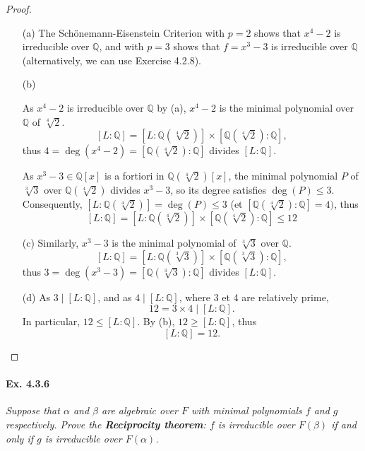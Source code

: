 \documentclass[11pt,a4paper]{article}
\newcommand{\Q}{\mathbb{Q}}
\begin{document}
\begin{proof}
\begin{enumerate}
\item[(a)]
The Sch\"onemann-Eisenstein Criterion with $p=2$ shows that $x^4-2$ is irreducible over $\Q$, and with $p=3$ shows that $f = x^3-3$ is irreducible over $\Q$ (alternatively, we can use Exercise 4.2.8).

\item[(b)]

As $x^4-2$ is irreducible over $\Q$ by (a), $x^4 - 2$ is the minimal polynomial over $\Q$ of $\sqrt[4]{2}$.
$$ [L : \Q] = [L : \Q(\sqrt[4]{2})] \times [\Q(\sqrt[4]{2}):\Q], $$ 
thus $4 = \deg(x^4-2) =  [\Q(\sqrt[4]{2}):\Q]$ divides $ [L : \Q] $.

As $x^3 - 3 \in \mathbb{Q}[x]$ is a fortiori in $\mathbb{Q}(\sqrt[4]{2})[x]$, the minimal polynomial $P$ of $\sqrt[3]{3}$ over $\Q(\sqrt[4]{2})$ divides $x^3-3$, so its degree satisfies $\deg(P) \leq 3$. Consequently, $[L : \Q(\sqrt[4]{2})] = \deg(P) \leq 3$ (et $[\Q(\sqrt[4]{2}):\Q] = 4)$, thus
$$ [L : \Q] = [L : \Q(\sqrt[4]{2})] \times [\Q(\sqrt[4]{2}):\Q] \leq 12$$


\item[(c)]
Similarly, $x^3-3$ is the minimal polynomial of $\sqrt[3]{3}$ over $\Q$.
$$ [L : \Q] = [L : \Q(\sqrt[3]{3})] \times [\Q(\sqrt[3]{3}):\Q], $$
thus $3 = \deg(x^3-3) =  [\Q(\sqrt[3]{3}):\Q]$ divides $ [L : \Q] $.


\item[(d)]
As $3\mid [L : \Q]$,  and as $4 \mid [L : \Q] $, where 3 et 4 are relatively prime, $$12 = 3 \times 4 \mid [L : \Q] .$$ In particular, $12 \leq [L : \Q] $. By (b), $12 \geq [L : \Q] $, thus
$$ [L : \Q] =12.$$

\end{enumerate}
\end{proof}

\paragraph{Ex. 4.3.6}

{\it Suppose that $\alpha$ and $\beta$ are algebraic over $F$ with minimal polynomials $f$ and $g$ respectively. Prove the {\bf Reciprocity theorem}: $f$ is irreducible over $F(\beta)$ if and only if $g$ is irreducible over $F(\alpha)$.
}
\end{document}
